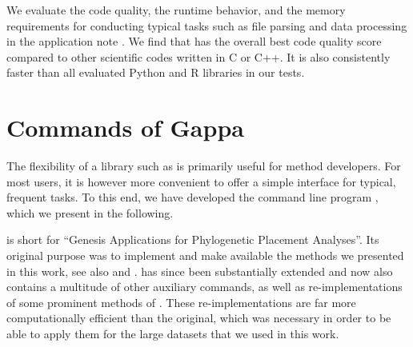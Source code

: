 We evaluate the code quality, the runtime behavior, and the memory requirements
for conducting typical tasks such as file parsing and data processing in the application note \cite{Czech2019-genesis-gappa}.
We find that  has the overall best code quality score compared to other scientific codes written in C or C++.
It is also consistently faster than all evaluated Python and R libraries in our tests.




\section{Commands of Gappa}
\label{ch:PipelineImplementation:sub:Commands}


The flexibility of a library such as  is primarily useful for method developers.
For most users, it is however more convenient to offer a simple interface for typical, frequent tasks.
To this end, we have developed the command line program , which we present in the following.

 is short for ``Genesis Applications for Phylogenetic Placement Analyses''.
Its original purpose was to implement and make available the methods we presented in this work,
see also  and .
 has since been substantially extended and 
now also contains a multitude of other auxiliary commands,
as well as re-implementations of some prominent methods of  \cite{Matsen2010}.
These re-implementations are far more computationally efficient than the original,
which was necessary in order to be able to apply them for the large datasets that we used in this work.

